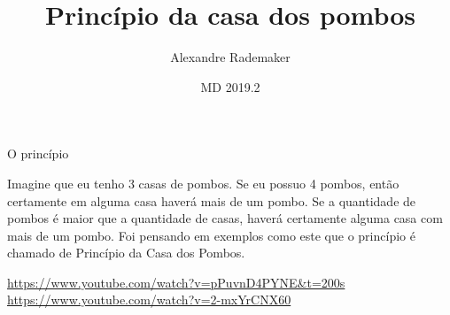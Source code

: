 \documentclass{beamer}
\title[PHP]{Princípio da casa dos pombos}
\author{Alexandre Rademaker}
\institute[FGV]{FGV/EMAp, Brazil}
\date{MD 2019.2}
\begin{document}
\frame{\textbf{\titlepage}}
\usebackgroundtemplate{}


\begin{frame}{O princípio}

  Imagine que eu tenho 3 casas de pombos. Se eu possuo 4 pombos, então
  certamente em alguma casa haverá mais de um pombo. Se a quantidade
  de pombos é maior que a quantidade de casas, haverá certamente
  alguma casa com mais de um pombo. Foi pensando em exemplos como este
  que o princípio é chamado de Princípio da Casa dos Pombos.

  \vspace{.5cm}

  \url{https://www.youtube.com/watch?v=pPuvnD4PYNE&t=200s}\\
  \url{https://www.youtube.com/watch?v=2-mxYrCNX60}
\end{frame}
\end{document}
